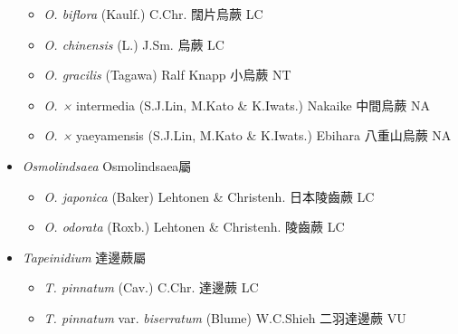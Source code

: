 \begin{itemize}
  \begin{itemize}
        \item[] \textit{O. biflora} (Kaulf.) C.Chr.  闊片烏蕨   LC
        \item[] \textit{O. chinensis} (L.) J.Sm.  烏蕨   LC
        \item[] \textit{O. gracilis} (Tagawa) Ralf Knapp  小烏蕨
   NT
        \item[] \textit{O. ×} intermedia \textit{} (S.J.Lin, M.Kato \& K.Iwats.) Nakaike 
                                        中間烏蕨   NA
        \item[] \textit{O. ×} yaeyamensis \textit{} (S.J.Lin, M.Kato \& K.Iwats.) Ebihara 
                                        八重山烏蕨   NA
  \end{itemize}
 \item[] \textit{Osmolindsaea} Osmolindsaea屬
                                
  \begin{itemize}
        \item[] \textit{O. japonica} (Baker) Lehtonen \& Christenh.  日本陵齒蕨   LC
        \item[] \textit{O. odorata} (Roxb.) Lehtonen \& Christenh.  陵齒蕨   LC
  \end{itemize}
 \item[] \textit{Tapeinidium} 達邊蕨屬
                                
  \begin{itemize}
        \item[] \textit{T. pinnatum} (Cav.) C.Chr.  達邊蕨   LC
        \item[] \textit{T. pinnatum} var. \textit{biserratum} (Blume) W.C.Shieh 
                                        二羽達邊蕨   VU
  \end{itemize}
  \end{itemize}
